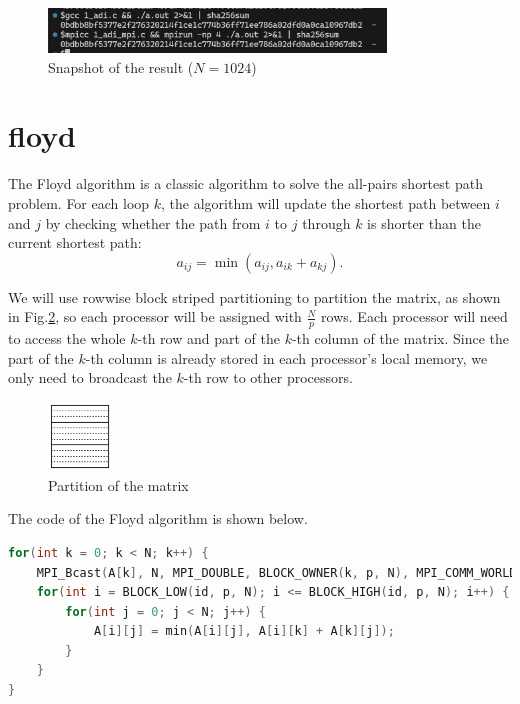 \begin{figure}[h]
    \centering
    \includegraphics[width=0.8\textwidth]{fig-adi-1024.png}
    \caption{Snapshot of the result ($N=1024$)}
    \label{fig:adi-1024}
\end{figure}

\section*{floyd}

The Floyd algorithm is a classic algorithm to solve the all-pairs shortest path problem. For each loop $k$, the algorithm will update the shortest path between $i$ and $j$ by checking whether the path from $i$ to $j$ through $k$ is shorter than the current shortest path:
$$
a_{ij} = \min(a_{ij},a_{ik}+a_{kj}).
$$

We will use rowwise block striped partitioning to partition the matrix, as shown in Fig.\ref*{fig:floyd}, so each processor will be assigned with $\frac{N}{p}$ rows. Each processor will need to access the whole $k$-th row and part of the $k$-th column of the matrix. Since the part of the $k$-th column is already stored in each processor's local memory, we only need to broadcast the $k$-th row to other processors.

\begin{figure}[h!]
    \centering
    \includegraphics[width=0.15\textwidth]{fig-floyd.png}
    \caption{Partition of the matrix}
    \label{fig:floyd}
\end{figure}

The code of the Floyd algorithm is shown below.

\begin{lstlisting}[language=C]
for(int k = 0; k < N; k++) {
    MPI_Bcast(A[k], N, MPI_DOUBLE, BLOCK_OWNER(k, p, N), MPI_COMM_WORLD);
    for(int i = BLOCK_LOW(id, p, N); i <= BLOCK_HIGH(id, p, N); i++) {
        for(int j = 0; j < N; j++) {
            A[i][j] = min(A[i][j], A[i][k] + A[k][j]);
        }
    }
}
\end{lstlisting}

